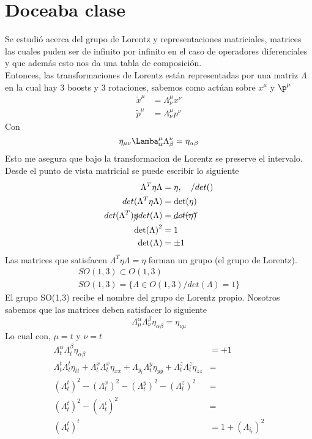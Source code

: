 \documentclass[../main.tex]{subfiles}
\begin{document}
\section{Doceaba clase}
Se estudió acerca del grupo de Lorentz y representaciones matriciales, matrices las cuales puden ser de infinito por infinito en el caso de operadores diferenciales y que además esto nos da una tabla de composición. \\
Entonces, las transformaciones de Lorentz están representadas por una matriz $\Lambda$ en la cual hay 3 boosts y 3 rotaciones, sabemos como actúan sobre $x^\mu$ y $\p^\mu$
\begin{align*}
  \tilde{x}^\mu & = \Lambda^\mu_\nu x^\nu \\
  \tilde{p}^\mu & =  \Lambda^\mu_\nu p^\nu
\end{align*}
Con
\begin{equation*}
  \eta_{\mu \nu}\Lamba^\mu_\alpha \Lambda_\beta^\nu = \eta_{\alpha \beta}
\end{equation*}
Esto me asegura que bajo la transformacion de Lorentz se preserve el intervalo. Desde el punto de vista matricial se puede escribir lo siguiente
\begin{align*}
  \Lambda^T \eta \Lambda & = \eta, \quad /det() \\
  det(\Lambda^T\eta \Lambda) & = \det(\eta) \\
  det(\Lambda^T)\cancel{\eta}det(\Lambda) & = \cancel{det(\eta)} \\
  \det(\Lambda)^2 & = 1 \\
  \det(\Lambda) & = \pm 1
\end{align*}
Las matrices que satisfacen $\Lambda^T \eta \Lambda = \eta$ forman un grupo (el grupo de Lorentz). 
\begin{align*}
  SO(1,3) \subset O(1,3) \\
  SO(1,3) = \{\Lambda \in O(1,3)/ det(\Lambda)=1\}
\end{align*}
El grupo SO(1,3) recibe el nombre del grupo de Lorentz propio. Nosotros sabemos que las matrices deben satisfacer lo siguiente
\begin{equation*}
  \Lambda^\alpha_\mu \Lambda^\beta_\nu \eta_{\alpha \beta} = \eta_{\nu \mu}
\end{equation*}
Lo cual con, $\mu=t$ y $\nu=t$
\begin{align*}
  \Lambda^\alpha_t\Lambda^\beta_t \eta_{\alpha \beta} & = +1 \\
  \Lambda^t_t \Lambda^t_t \eta_{tt} + \Lambda^x_t \Lambda^x_t \eta_{xx} + \Lambda_y_t\Lambda^y_t \eta_{yy} + \Lambda^z_t\Lambda^z_t \eta_{zz} & = \\
  \left( \Lambda^t_t \right)^2 - \left( \Lambda^x_t \right)^2 - \left( \Lambda^y_t \right)^2 - \left( \Lambda_t^z \right)^2 & = \\
  \left( \Lambda_t^t \right)^2 - \left( \Lambda^i_t \right)^2 & = \\
  \left( \Lambda_t^t \right)^t & = 1 + \left( \Lambda_i_t \right)^2
\end{align*}
\end{document}
